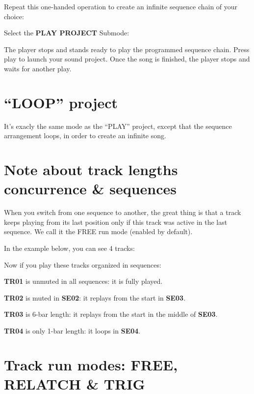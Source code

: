 Repeat this one-handed operation to create an infinite sequence chain of your choice:


Select the \textbf{PLAY PROJECT} Submode:


The player stops and stands ready to play the programmed sequence chain. Press play \playicon{} to launch your sound project. Once the song is finished, the player stops and waits for another play.



\section{“LOOP” project}

It's exacly the same mode as the ``PLAY'' project, except that the sequence arrangement loops, in order to create an infinite song.



\section{Note about track lengths concurrence \& sequences}

When you switch from one sequence to another, the great thing is that a track keeps playing from its last position only if this track was active in the last sequence. We call it the FREE run mode (enabled by default).

In the example below, you can see 4 tracks:


Now if you play these tracks organized in sequences:


\textbf{TR01} is unmuted in all sequences: it is fully played.

\textbf{TR02} is muted in \textbf{SE02}: it replays from the start in \textbf{SE03}.

\textbf{TR03} is 6-bar length: it replays from the start in the middle of \textbf{SE03}.

\textbf{TR04} is only 1-bar length: it loops in \textbf{SE04}.


\section{Track run modes: FREE, RELATCH \& TRIG}

